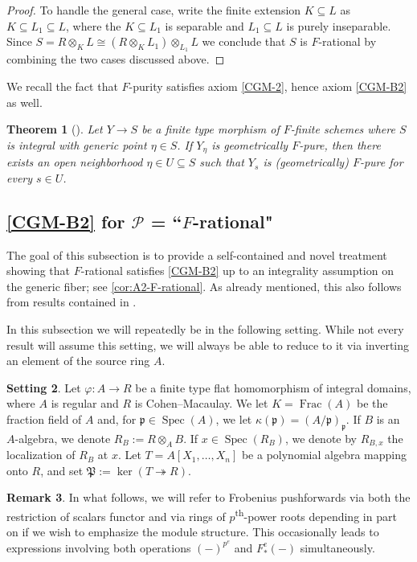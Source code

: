 \documentclass[reqno,11pt]{amsart}
\numberwithin{equation}{section}
\newtheorem{theorem}{Theorem}[section]
\theoremstyle{definition}
\newtheorem{setting}[theorem]{Setting}
\theoremstyle{definition}
\theoremstyle{definition}
\newtheorem{remark}[theorem]{Remark}
\theoremstyle{remark}
\renewcommand{\ker}{\operatorname{ker}}
\newcommand{\Spec}{\operatorname{Spec}}
\newcommand{\ts}{\textsuperscript}
\newcommand{\Frac}{\operatorname{Frac}}
\newcommand{\fp}{\mathfrak{p}}
\newcommand{\fP}{\mathfrak{P}}
\newcommand{\cP}{\mathcal{P}}
\begin{document}
\begin{proof}
    To handle the general case, write the finite extension $K \subseteq L$ as $K \subseteq L_1 \subseteq L$, where the $K \subseteq L_1$ is separable and $L_1 \subseteq L$ is purely inseparable. Since $S = R \otimes_K L \cong (R \otimes_K L_1) \otimes_{L_1} L$ we conclude that $S$ is $F$-rational by combining the two cases discussed above.
\end{proof}


We recall the fact that $F$-purity satisfies axiom \ref{CGM-2}, hence axiom \ref{CGM-B2} as well.

\begin{theorem}[{\cite[Corollary 5.2]{SZ13}}]\label{thm:a-2-F-pure}
Let $Y\to S$ be a finite type morphism of $F$-finite schemes where $S$ is integral with generic point $\eta\in S$. If $Y_\eta$ is geometrically $F$-pure, then there exists an open neighborhood $\eta\in U\subseteq S$ such that $Y_s$ is (geometrically) $F$-pure for every $s\in U$.
\end{theorem}

\subsection{\texorpdfstring{\ref{CGM-B2}}{(B2)} for \texorpdfstring{$\cP$ = ``$F$-rational"}{P = "F-rational"}}


The goal of this subsection is to provide a self-contained and novel treatment showing that $F$-rational satisfies \ref{CGM-B2} up to an integrality assumption on the generic fiber; see \cref{cor:A2-F-rational}. As already mentioned, this also follows from results contained in \cite{PSZ18}.

In this subsection we will repeatedly be in the following setting. While not every result will assume this setting, we will always be able to reduce to it via inverting an element of the source ring $A$.
\begin{setting}\label{setting-B2}
    Let $\varphi\colon A \to R$ be a finite type flat homomorphism of integral domains, where $A$ is regular and $R$ is Cohen--Macaulay. We let $K=\Frac(A)$ be the fraction field of $A$ and, for $\fp \in \Spec(A)$, we let $\kappa(\fp) = (A/\fp)_\fp$. If $B$ is an $A$-algebra, we denote $R_B:=R\otimes_A B$. If $x\in\Spec(R_B)$, we denote by $R_{B,x}$ the localization of $R_B$ at $x$. Let $T=A[X_1,\ldots,X_n]$ be a polynomial algebra mapping onto $R$, and set $\fP := \ker(T \twoheadrightarrow R)$.
\end{setting}

\begin{remark}
    In what follows, we will refer to Frobenius pushforwards via both the restriction of scalars functor and via rings of $p$\ts{th}-power roots depending in part on if we wish to emphasize the module structure. This occasionally leads to expressions involving both operations $(-)^{p^e}$ and $F^e_*(-)$ simultaneously.
\end{remark}
\end{document}
